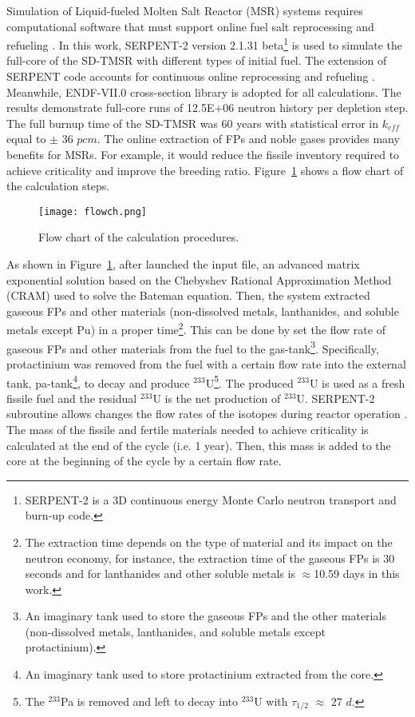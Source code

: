 Simulation of Liquid-fueled Molten Salt Reactor (MSR) systems requires computational software that must support online fuel salt reprocessing and refueling \cite{serp2014molten}. In this work, SERPENT-2 version 2.1.31 beta\footnote{SERPENT-2 is a \gls{3D} continuous energy Monte Carlo neutron transport and burn-up code.} \cite{leppanen2014serpent} is used to simulate the full-core of the SD-TMSR with different types of initial fuel. The extension of SERPENT code accounts for continuous online reprocessing and refueling \cite{aufiero2013extended}. Meanwhile, ENDF-VII.0 cross-section library is adopted for all calculations. The results demonstrate full-core runs of 12.5E+06 neutron history per depletion step. The full burnup time of the SD-TMSR was 60 years with statistical error in $k_{eff}$ equal to $\pm$ $36$ $pcm$. The online extraction of \gls{FPs} and noble gases  provides many benefits for MSRs. For example, it would reduce the fissile inventory required to achieve criticality and improve the breeding ratio.
Figure~\ref{fig:flow} shows a flow chart of the calculation steps. 

\begin{figure}[t!] %
	\texttt{[image: flowch.png]}
	\caption{Flow chart of the calculation procedures.}
	\label{fig:flow}
\end{figure}

As shown in Figure~\ref{fig:flow}, after launched the input file, an advanced matrix exponential solution based on the Chebyshev Rational Approximation Method (CRAM) \cite{isotalo2016improving} used to solve the Bateman equation. Then, the system extracted gaseous \gls{FPs} and other materials (non-dissolved metals, lanthanides, and soluble metals except Pu) in a proper time\footnote{The extraction time depends on the type of material and its impact on the neutron economy, for instance, the extraction time of the gaseous \gls{FPs} is 30 seconds and for lanthanides and other soluble metals is $\approx$10.59 days in this work.}. This can be done by set the flow rate of gaseous \gls{FPs} and other materials from the fuel to the gas-tank\footnote{An imaginary tank used to store the gaseous \gls{FPs} and the other materials (non-dissolved metals, lanthanides, and soluble metals except protactinium).}. Specifically, protactinium was removed from the fuel with a certain flow rate into the external tank, pa-tank\footnote{An imaginary tank used to store protactinium extracted from the core.}, to decay and produce $^{233}$U\footnote{The $^{233}$Pa is removed and left to decay into $^{233}$U with $\tau_{1/2}$ $\approx$ $27$ $d$.}. The produced $^{233}$U is used as a fresh fissile fuel and the residual $^{233}$U is the net production of $^{233}$U. SERPENT-2 subroutine allows changes the flow rates of the isotopes during reactor operation \cite{aufiero2013extended}. The mass of the fissile and fertile materials needed to achieve criticality is calculated at the end of the cycle (i.e. 1 year). Then, this mass is added to the core at the beginning of the cycle by a certain flow rate.


